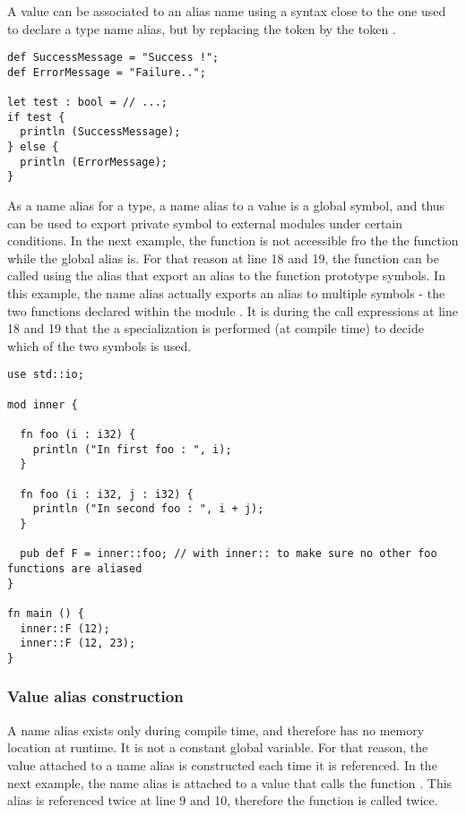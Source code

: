 A value can be associated to an alias name using a syntax close to the one used
to declare a type name alias, but by replacing the token \token{:} by the token
\token{=}.

\begin{lstlisting}[style=coloredverbatim]
def SuccessMessage = "Success !";
def ErrorMessage = "Failure..";

let test : bool = // ...;
if test {
  println (SuccessMessage);
} else {
  println (ErrorMessage);
}
\end{lstlisting}

As a name alias for a type, a name alias to a value is a global symbol, and thus
can be used to export private symbol to external modules under certain
conditions. In the next example, the function  is not accessible fro
the the  function while the global alias  is. For that
reason at line 18 and 19, the function  can be called using the alias
 that export an alias to the function prototype symbols. In this
example, the name alias actually exports an alias to multiple symbols - the two
functions  declared within the module . It is during the
call expressions at line 18 and 19 that the a specialization is performed (at
compile time) to decide which of the two symbols is used.

\begin{lstlisting}[style=coloredverbatim]
use std::io;

mod inner {

  fn foo (i : i32) {
    println ("In first foo : ", i);
  }

  fn foo (i : i32, j : i32) {
    println ("In second foo : ", i + j);
  }

  pub def F = inner::foo; // with inner:: to make sure no other foo functions are aliased
}

fn main () {
  inner::F (12);
  inner::F (12, 23);
}
\end{lstlisting}

\subsubsection*{Value alias construction}

A name alias exists only during compile time, and therefore has no memory
location at runtime. It is not a constant global variable. For that reason, the
value attached to a name alias is constructed each time it is referenced. In the
next example, the name alias  is attached to a value that calls the
function . This alias is referenced twice at line 9 and 10, therefore
the function  is called twice.

